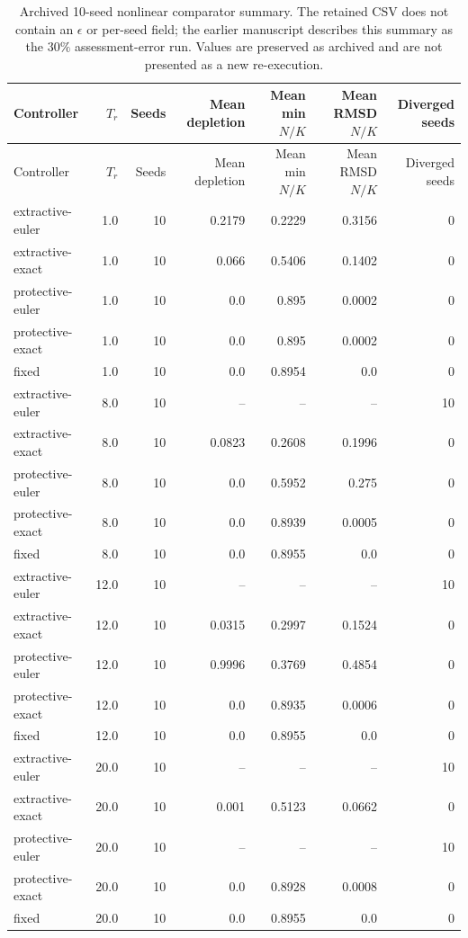 \begin{landscape}
\scriptsize
\setlength{\tabcolsep}{5pt}
\begin{longtable}{@{}p{3.3cm}r r r r r r@{}}
\caption{Archived 10-seed nonlinear comparator summary. The retained CSV does not contain an \(\epsilon\) or per-seed field; the earlier manuscript describes this summary as the \(30\%\) assessment-error run. Values are preserved as archived and are not presented as a new re-execution.}\label{tab:comparator-mc}\\
\toprule Controller & \(T_r\) & Seeds & Mean depletion & Mean min \(N/K\) & Mean RMSD \(N/K\) & Diverged seeds \\
\midrule\endfirsthead
\toprule Controller & \(T_r\) & Seeds & Mean depletion & Mean min \(N/K\) & Mean RMSD \(N/K\) & Diverged seeds \\
\midrule\endhead
\bottomrule\endfoot
extractive-euler & 1.0 & 10 & 0.2179 & 0.2229 & 0.3156 & 0 \\
extractive-exact & 1.0 & 10 & 0.066 & 0.5406 & 0.1402 & 0 \\
protective-euler & 1.0 & 10 & 0.0 & 0.895 & 0.0002 & 0 \\
protective-exact & 1.0 & 10 & 0.0 & 0.895 & 0.0002 & 0 \\
fixed & 1.0 & 10 & 0.0 & 0.8954 & 0.0 & 0 \\
extractive-euler & 8.0 & 10 & -- & -- & -- & 10 \\
extractive-exact & 8.0 & 10 & 0.0823 & 0.2608 & 0.1996 & 0 \\
protective-euler & 8.0 & 10 & 0.0 & 0.5952 & 0.275 & 0 \\
protective-exact & 8.0 & 10 & 0.0 & 0.8939 & 0.0005 & 0 \\
fixed & 8.0 & 10 & 0.0 & 0.8955 & 0.0 & 0 \\
extractive-euler & 12.0 & 10 & -- & -- & -- & 10 \\
extractive-exact & 12.0 & 10 & 0.0315 & 0.2997 & 0.1524 & 0 \\
protective-euler & 12.0 & 10 & 0.9996 & 0.3769 & 0.4854 & 0 \\
protective-exact & 12.0 & 10 & 0.0 & 0.8935 & 0.0006 & 0 \\
fixed & 12.0 & 10 & 0.0 & 0.8955 & 0.0 & 0 \\
extractive-euler & 20.0 & 10 & -- & -- & -- & 10 \\
extractive-exact & 20.0 & 10 & 0.001 & 0.5123 & 0.0662 & 0 \\
protective-euler & 20.0 & 10 & -- & -- & -- & 10 \\
protective-exact & 20.0 & 10 & 0.0 & 0.8928 & 0.0008 & 0 \\
fixed & 20.0 & 10 & 0.0 & 0.8955 & 0.0 & 0 \\
\end{longtable}
\end{landscape}
